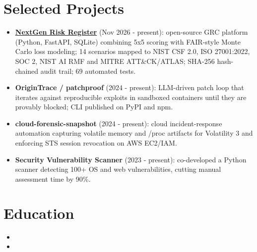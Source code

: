 \documentclass[11pt,a4paper,sans]{moderncv}
\begin{document}
\section{Selected Projects}
\vspace{1pt}
\begin{itemize}
\item {\textbf{\href{https://github.com/purvanshbhatt/nextgen-risk-register}{NextGen Risk Register}} (Nov 2026 - present): open-source GRC platform (Python, FastAPI, SQLite) combining 5x5 scoring with FAIR-style Monte Carlo loss modeling; 14 scenarios mapped to NIST CSF 2.0, ISO 27001:2022, SOC 2, NIST AI RMF and MITRE ATT\&CK/ATLAS; SHA-256 hash-chained audit trail; 69 automated tests.}
\item {\textbf{OriginTrace / patchproof} (2024 - present): LLM-driven patch loop that iterates against reproducible exploits in sandboxed containers until they are provably blocked; CLI published on PyPI and npm.}
\item {\textbf{cloud-forensic-snapshot} (2024 - present): cloud incident-response automation capturing volatile memory and /proc artifacts for Volatility 3 and enforcing STS session revocation on AWS EC2/IAM.}
\item {\textbf{Security Vulnerability Scanner} (2023 - present): co-developed a Python scanner detecting 100+ OS and web vulnerabilities, cutting manual assessment time by 90\%.}
\end{itemize}


\section{Education}
\vspace{1pt}
\begin{itemize}

\item{}

\vspace{3pt}

\item{}

\end{itemize}
\end{document}
